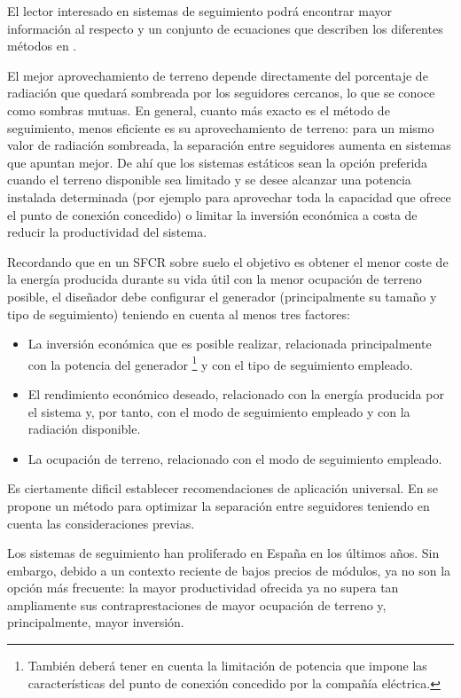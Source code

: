 El lector interesado en sistemas de seguimiento podrá encontrar mayor
información al respecto y un conjunto de ecuaciones que describen
los diferentes métodos en \cite{Perpinan2008}. 

El mejor aprovechamiento de terreno depende directamente del porcentaje
de radiación que quedará sombreada por los seguidores cercanos, lo
que se conoce como sombras mutuas. En general, cuanto más exacto es
el método de seguimiento, menos eficiente es su aprovechamiento de
terreno: para un mismo valor de radiación sombreada, la separación
entre seguidores aumenta en sistemas que apuntan mejor. De ahí que
los sistemas estáticos sean la opción preferida cuando el terreno
disponible sea limitado y se desee alcanzar una potencia instalada
determinada (por ejemplo para aprovechar toda la capacidad que ofrece
el punto de conexión concedido) o limitar la inversión económica a
costa de reducir la productividad del sistema.

Recordando que en un SFCR sobre suelo el objetivo es obtener el menor
coste de la energía producida durante su vida útil con la menor ocupación
de terreno posible, el diseñador debe configurar el generador (principalmente
su tamaño y tipo de seguimiento) teniendo en cuenta al menos tres
factores:
\begin{itemize}
\item La inversión económica que es posible realizar, relacionada principalmente
con la potencia del generador%
\footnote{También deberá tener en cuenta la limitación de potencia que impone
las características del punto de conexión concedido por la compañía
eléctrica.} y con el tipo de seguimiento empleado.
\item El rendimiento económico deseado, relacionado con la energía producida
por el sistema y, por tanto, con el modo de seguimiento empleado y
con la radiación disponible. 
\item La ocupación de terreno, relacionado con el modo de seguimiento empleado.
\end{itemize}
Es ciertamente dificil establecer recomendaciones de aplicación
universal. En \cite{Perpinan2012} se propone un método para optimizar
la separación entre seguidores teniendo en cuenta las consideraciones
previas.

Los sistemas de seguimiento han proliferado en España en los últimos
años. Sin embargo, debido a un contexto reciente de bajos precios de
módulos, ya no son la opción más frecuente: la mayor productividad
ofrecida ya no supera tan ampliamente sus contraprestaciones de mayor
ocupación de terreno y, principalmente, mayor inversión.

